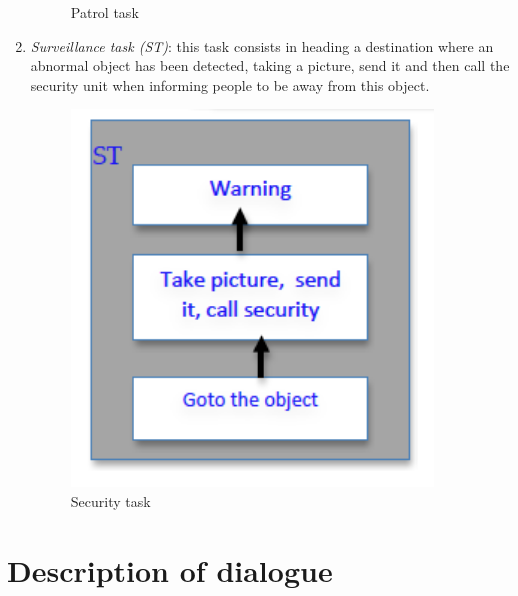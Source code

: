 \documentclass{article}
\begin{document}
\begin{enumerate}
\begin{figure}[htbp]
\begin{center}
\caption{Patrol task }
\label{FigPatrolTask}
\end{center}
\end{figure}
\item {\it Surveillance task (ST)}: this task consists in heading a destination where an abnormal object has been detected, taking a picture, send it and then call the security unit when informing people to be away from this object. 
\begin{figure}[htbp]
\begin{center}
\includegraphics[height=10cm]{fig/SecurityTask}
\caption{Security  task }
\label{FigsecurityTask}
\end{center}
\end{figure}
\end{enumerate}

\section{Description of dialogue}
\end{document}
